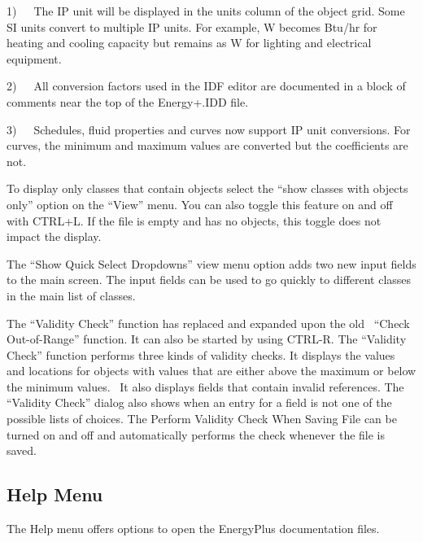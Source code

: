 1)~~~The IP unit will be displayed in the units column of the object grid. Some SI units convert to multiple IP units. For example, W becomes Btu/hr for heating and cooling capacity but remains as W for lighting and electrical equipment.

2)~~~All conversion factors used in the IDF editor are documented in a block of comments near the top of the Energy+.IDD file.

3)~~~Schedules, fluid properties and curves now support IP unit conversions. For curves, the minimum and maximum values are converted but the coefficients are not.

To display only classes that contain objects select the ``show classes with objects only'' option on the ``View'' menu. You can also toggle this feature on and off with CTRL+L. If the file is empty and has no objects, this toggle does not impact the display.

The ``Show Quick Select Dropdowns'' view menu option adds two new input fields to the main screen. The input fields can be used to go quickly to different classes in the main list of classes.

The ``Validity Check'' function has replaced and expanded upon the old~ ``Check Out-of-Range'' function. It can also be started by using CTRL-R. The ``Validity Check'' function performs three kinds of validity checks. It displays the values and locations for objects with values that are either above the maximum or below the minimum values.~ It also displays fields that contain invalid references. The ``Validity Check'' dialog also shows when an entry for a field is not one of the possible lists of choices. The Perform Validity Check When Saving File can be turned on and off and automatically performs the check whenever the file is saved.

\subsection{Help Menu}\label{help-menu-000}

The Help menu offers options to open the EnergyPlus documentation files.
